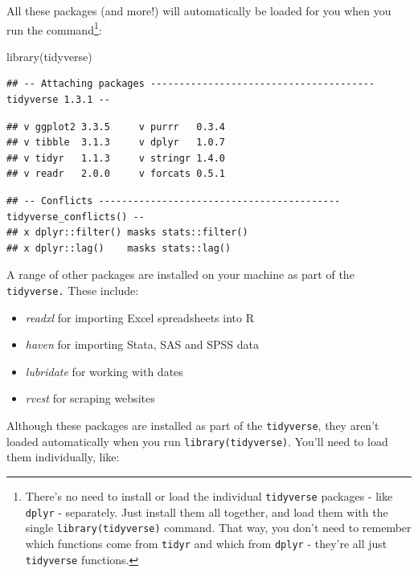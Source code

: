 \documentclass[
]{book}
\newenvironment{Shaded}{\begin{snugshade}}{\end{snugshade}}
\newcommand{\FunctionTok}[1]{\textcolor[rgb]{0.00,0.00,0.00}{#1}}
\newcommand{\NormalTok}[1]{#1}
\providecommand{\tightlist}{%
  \setlength{\itemsep}{0pt}\setlength{\parskip}{0pt}}
\begin{document}
All these packages (and more!) will automatically be loaded for you when you run the command\footnote{There's no need to install or load the individual \texttt{tidyverse} packages - like \texttt{dplyr} - separately. Just install them all together, and load them with the single \texttt{library(tidyverse)} command. That way, you don't need to remember which functions come from \texttt{tidyr} and which from \texttt{dplyr} - they're all just \texttt{tidyverse} functions.}:

\begin{Shaded}
\begin{Highlighting}[]
\FunctionTok{library}\NormalTok{(tidyverse)}
\end{Highlighting}
\end{Shaded}

\begin{verbatim}
## -- Attaching packages --------------------------------------- tidyverse 1.3.1 --
\end{verbatim}

\begin{verbatim}
## v ggplot2 3.3.5     v purrr   0.3.4
## v tibble  3.1.3     v dplyr   1.0.7
## v tidyr   1.1.3     v stringr 1.4.0
## v readr   2.0.0     v forcats 0.5.1
\end{verbatim}

\begin{verbatim}
## -- Conflicts ------------------------------------------ tidyverse_conflicts() --
## x dplyr::filter() masks stats::filter()
## x dplyr::lag()    masks stats::lag()
\end{verbatim}

A range of other packages are installed on your machine as part of the \texttt{tidyverse.} These include:

\begin{itemize}
\tightlist
\item
  \emph{readxl} for importing Excel spreadsheets into R
\item
  \emph{haven} for importing Stata, SAS and SPSS data
\item
  \emph{lubridate} for working with dates
\item
  \emph{rvest} for scraping websites
\end{itemize}

Although these packages are installed as part of the \texttt{tidyverse}, they aren't loaded automatically when you run \texttt{library(tidyverse)}. You'll need to load them individually, like:
\end{document}
